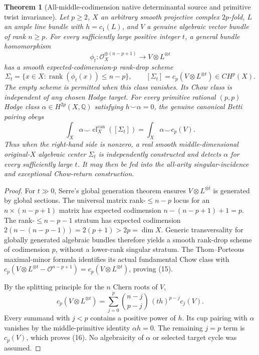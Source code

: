 \documentclass[11pt]{article}
\newtheorem{theorem}{Theorem}
\begin{document}
\begin{theorem}[All-middle-codimension native determinantal source
and primitive twist invariance]\label{thm:detbirth}
Let $p\ge2$, $X$ an arbitrary smooth projective complex
$2p$-fold, $L$ an ample line bundle with $h=c_1(L)$,
and $V$ a genuine algebraic vector bundle of rank $n\ge p$.
For every sufficiently large positive integer $t$, a
general bundle homomorphism
\[
 \phi_t:\mathcal O_X^{\oplus(n-p+1)}
             \longrightarrow V\otimes L^{\otimes t}
\]
has a \emph{smooth} expected-codimension-$p$
rank-drop scheme
\[
 \Sigma_t=\{x\in X:
    \operatorname{rank}(\phi_t(x))\le n-p\},
 \qquad
 \boxed{[\Sigma_t]=c_p(V\otimes L^{\otimes t})
                   \in CH^p(X).}                       \tag{15}
\]
The empty scheme is permitted when this class vanishes.
Its Chow class is independent of any chosen Hodge target.
For every \emph{primitive} rational $(p,p)$ Hodge class
$\alpha\in H^{2p}(X,\mathbb Q)$ satisfying $h\smile\alpha=0$,
the genuine canonical Betti pairing obeys
\[
 \boxed{\int_X\alpha\smile
  \operatorname{cl}^{\mathrm{can}}_X([\Sigma_t])
   =\int_X\alpha\smile c_p(V).}                        \tag{16}
\]
Thus when the right-hand side is nonzero, a real smooth
middle-dimensional original-$X$ algebraic center
$\Sigma_t$ is independently constructed and detects
$\alpha$ for every sufficiently large $t$.
It may then be fed into the all-arity singular-incidence
and exceptional Chow-return construction.
\end{theorem}
\begin{proof}
For $t\gg0$, Serre's global generation theorem ensures
$V\otimes L^{\otimes t}$ is generated by global sections.
The universal matrix rank-$\le n-p$ locus for an
$n\times(n-p+1)$ matrix has expected codimension
$n-(n-p+1)+1=p$. The rank-$\le n-p-1$ stratum has
expected codimension
$2(n-(n-p-1))=2(p+1)>2p=\dim X$.
Generic transversality for globally generated algebraic
bundles therefore yields a smooth rank-drop scheme of
codimension $p$, without a lower-rank singular stratum.
The Thom--Porteous maximal-minor formula identifies its
actual fundamental Chow class with
$c_p(V\otimes L^{\otimes t}-\mathcal O^{n-p+1})
=c_p(V\otimes L^{\otimes t})$, proving (15).

By the splitting principle for the $n$ Chern roots of $V$,
\[
 c_p(V\otimes L^{\otimes t})
 =\sum_{j=0}^p
    {n-j\choose p-j}\,(t h)^{p-j} c_j(V).
                                                            \tag{17}
\]
Every summand with $j<p$ contains a positive power of
$h$. Its cup pairing with $\alpha$ vanishes by the
middle-primitive identity $\alpha h=0$.
The remaining $j=p$ term is $c_p(V)$, which proves
(16). No algebraicity of $\alpha$ or selected
target cycle was assumed.
\end{proof}
\end{document}
